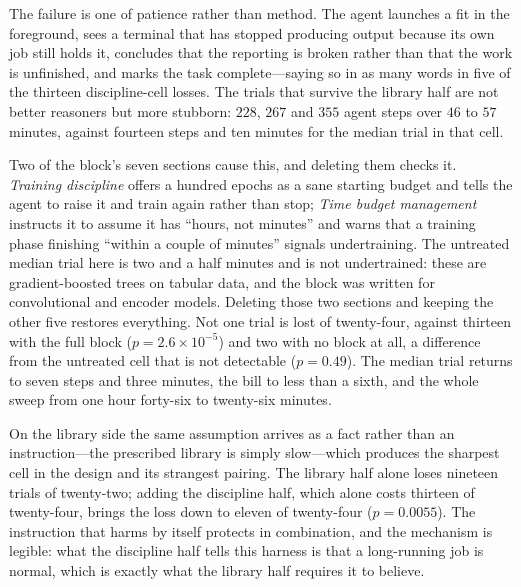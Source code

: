 The failure is one of patience rather than method. The agent launches a fit in
the foreground, sees a terminal that has stopped producing output because its own
job still holds it, concludes that the reporting is broken rather than that the
work is unfinished, and marks the task complete---saying so in as many words in
five of the thirteen discipline-cell losses. The trials that survive the library
half are not better reasoners but more stubborn: $228$, $267$ and $355$ agent
steps over $46$ to $57$ minutes, against fourteen steps and ten minutes for the
median trial in that cell.

Two of the block's seven sections cause this, and deleting them checks it.
\emph{Training discipline} offers a hundred epochs as a sane starting budget and
tells the agent to raise it and train again rather than stop; \emph{Time budget
management} instructs it to assume it has ``hours, not minutes'' and warns that a
training phase finishing ``within a couple of minutes'' signals undertraining.
The untreated median trial here is two and a half minutes and is not
undertrained: these are gradient-boosted trees on tabular data, and the block was
written for convolutional and encoder models. Deleting those two sections and
keeping the other five restores everything. Not one trial is lost of twenty-four,
against thirteen with the full block ($p=2.6\times10^{-5}$) and two with no block
at all, a difference from the untreated cell that is not detectable ($p=0.49$).
The median trial returns to seven steps and three minutes, the bill to less than
a sixth, and the whole sweep from one hour forty-six to twenty-six minutes.

On the library side the same assumption arrives as a fact rather than an
instruction---the prescribed library is simply slow---which produces the sharpest
cell in the design and its strangest pairing. The library half alone loses
nineteen trials of twenty-two; adding the discipline half, which alone costs
thirteen of twenty-four, brings the loss down to eleven of twenty-four
($p=0.0055$). The instruction that harms by itself protects in combination, and
the mechanism is legible: what the discipline half tells this harness is that a
long-running job is normal, which is exactly what the library half requires it to
believe.

